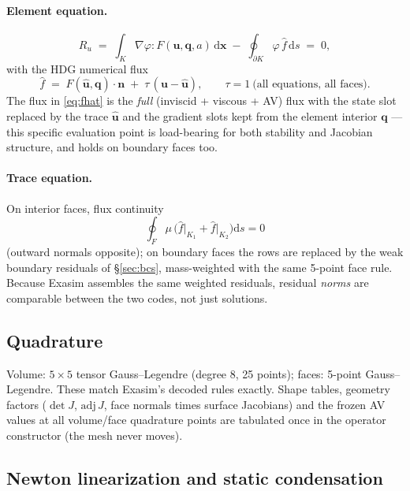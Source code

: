 \documentclass[11pt]{article}
\newcommand{\bu}{\mathbf{u}}
\newcommand{\bq}{\mathbf{q}}
\newcommand{\buh}{\widehat{\mathbf{u}}}
\newcommand{\bn}{\mathbf{n}}
\newcommand{\bx}{\mathbf{x}}
\begin{document}
\paragraph{Element equation.}
\begin{equation}
R_u \;=\; \int_K \nabla\varphi : F(\bu, \bq, a)\,\mathrm{d}\bx
\;-\; \oint_{\partial K} \varphi\, \widehat f\,\mathrm{d}s \;=\; 0,
\end{equation}
with the HDG numerical flux
\begin{equation}
\widehat f \;=\; F(\buh, \bq)\cdot\bn \;+\; \tau\,(\bu - \buh),
\qquad \tau = 1 \ \text{(all equations, all faces)}.
\label{eq:fhat}
\end{equation}
The flux in \eqref{eq:fhat} is the \emph{full} (inviscid + viscous + AV) flux
with the state slot replaced by the trace $\buh$ and the gradient slots kept
from the element interior $\bq$ --- this specific evaluation point is
load-bearing for both stability and Jacobian structure, and holds on boundary
faces too.

\paragraph{Trace equation.} On interior faces, flux continuity
\begin{equation}
\oint_F \mu\,\bigl(\widehat f\big|_{K_1} + \widehat f\big|_{K_2}\bigr)
\mathrm{d}s = 0
\end{equation}
(outward normals opposite); on boundary faces the rows are replaced by the
weak boundary residuals of \S\ref{sec:bcs}, mass-weighted with the same
5-point face rule. Because Exasim assembles the same weighted residuals,
residual \emph{norms} are comparable between the two codes, not just
solutions.

\subsection{Quadrature}

Volume: $5\times5$ tensor Gauss--Legendre (degree 8, 25 points); faces:
5-point Gauss--Legendre. These match Exasim's decoded rules exactly. Shape
tables, geometry factors ($\det J$, $\mathrm{adj}\,J$, face normals times
surface Jacobians) and the frozen AV values at all volume/face quadrature
points are tabulated once in the operator constructor (the mesh never moves).

\subsection{Newton linearization and static condensation}
\end{document}
